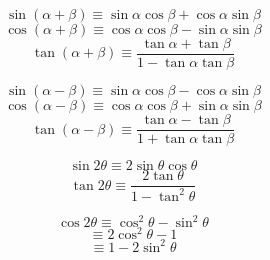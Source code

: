 \documentclass[../main.tex]{subfile}
\begin{document}
\begin{figure}[h]
\centering
\large
\begin{minipage}{0.49\linewidth}
	$$\sin(\alpha + \beta) \equiv \sin\alpha\cos\beta + \cos\alpha\sin\beta$$
	\vspace{0.5em}
	$$\cos(\alpha + \beta) \equiv \cos\alpha\cos\beta - \sin\alpha\sin\beta$$
	\vspace{0.5em}
	$$\tan(\alpha + \beta) \equiv \frac{\tan\alpha + \tan\beta}{1 - \tan\alpha\tan\beta}$$
\end{minipage}\hfill
\begin{minipage}{0.49\linewidth}
	$$\sin(\alpha - \beta) \equiv \sin\alpha\cos\beta - \cos\alpha\sin\beta$$
	\vspace{0.5em}
	$$\cos(\alpha - \beta) \equiv \cos\alpha\cos\beta + \sin\alpha\sin\beta$$
	\vspace{0.5em}
	$$\tan(\alpha - \beta) \equiv \frac{\tan\alpha - \tan\beta}{1 + \tan\alpha\tan\beta}$$
\end{minipage}
\normalsize
\end{figure}

\begin{figure}[H]
\centering
\large
\begin{minipage}{0.49\linewidth}
$$\sin 2\theta \equiv 2\sin\theta\cos\theta$$
\vspace{0.5em}
$$\tan2\theta \equiv \frac{2\tan\theta}{1 - \tan^2\theta}$$
\end{minipage}\hfill
\begin{minipage}{0.49\linewidth}
$$\cos 2\theta \equiv \cos^2\theta - \sin^2\theta$$
$$\equiv 2\cos^2\theta - 1$$
$$\equiv 1 - 2\sin^2\theta$$
\end{minipage}
\normalsize
\end{figure}

\newpage

\end{document}
